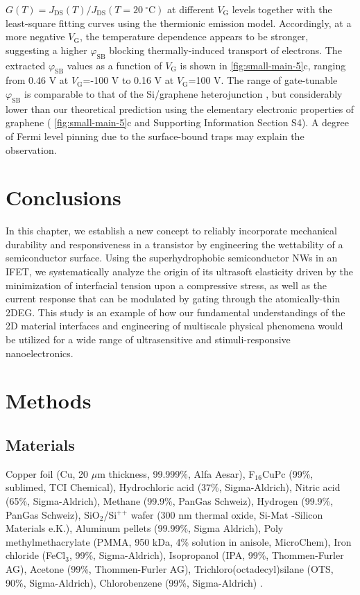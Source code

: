 \(G(T)=J_{\mathrm{DS}}(T)/J_{\mathrm{DS}}(T=20\ ^{\circ} \mathrm{C})\)
at different \(V_{\mathrm{G}}\) levels together with the least-square
fitting curves using the thermionic emission model. Accordingly, at a
more negative \(V_{\mathrm{G}}\), the temperature dependence appears
to be stronger, suggesting a higher \(\varphi_{\mathrm{SB}}\) blocking
thermally-induced transport of electrons. The extracted
\(\varphi_{\mathrm{SB}}\) values as a function of \(V_{\mathrm{G}}\)
is shown in \autoref{fig:small-main-5}c, ranging from 0.46 V at
\(V_{\mathrm{G}}\)=-100 V to 0.16 V at \(V_{\mathrm{G}}\)=100 V.  The
range of gate-tunable \(\varphi_{\mathrm{SB}}\) is comparable to that
of the Si/graphene heterojunction \cite{Yang_2012_Barristor}, but
considerably lower than our theoretical prediction using the
elementary electronic properties of graphene (
\autoref{fig:small-main-5}c and Supporting Information Section S4). A
degree of Fermi level pinning due to the surface-bound traps
\cite{Meric_2008_saturation_gr_FET} may explain the observation.

\section{Conclusions}
\label{sec:small-conclusions}

In this chapter, we establish a new concept to reliably incorporate
mechanical durability and responsiveness in a transistor by
engineering the wettability of a semiconductor surface. Using the
superhydrophobic semiconductor NWs in an IFET, we systematically
analyze the origin of its ultrasoft elasticity driven by the
minimization of interfacial tension upon a compressive stress, as well
as the current response that can be modulated by gating through the
atomically-thin 2DEG.
%
This study is an example of how our fundamental understandings of the
2D material interfaces and engineering of multiscale physical
phenomena would be utilized for a wide range of ultrasensitive and
stimuli-responsive nano\-electronics.




\section{Methods}
\label{sec:small-method}

\subsection{Materials}
\label{sec:small-org2cee247}
Copper foil (Cu, 20 \(\mu \mathrm{m}\) thickness, 99.999\%, Alfa Aesar),
F\(_{\text{16}}\)CuPc (99\%, sublimed, TCI Chemical), Hydrochloric acid (37\%,
Sigma-Aldrich), Nitric acid (65\%, Sigma-Aldrich), Methane (99.9\%,
PanGas Schweiz), Hydrogen (99.9\%, PanGas Schweiz), SiO\(_{\text{2}}\)/Si\(^{\text{++}}\)
wafer (300 nm thermal oxide, Si-Mat -Silicon Materials e.K.), Aluminum
pellets (99.99\%, Sigma Aldrich), Poly methylmethacrylate (PMMA, 950
kDa, 4\% solution in anisole, MicroChem), Iron chloride (FeCl\(_{\text{3}}\), 99\%,
Sigma-Aldrich), Isopropanol (IPA, 99\%, Thommen-Furler AG), Acetone
(99\%, Thommen-Furler AG), Trichloro(octadecyl)silane (OTS, 90\%,
Sigma-Aldrich), Chlorobenzene (99\%, Sigma-Aldrich) .

